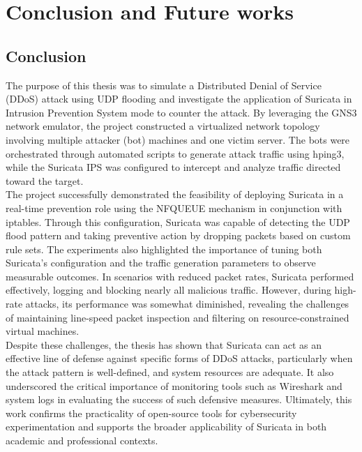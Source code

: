 \chapter{Conclusion and Future works}
\section{Conclusion}
The purpose of this thesis was to simulate a Distributed Denial of Service (DDoS) attack using UDP flooding and investigate the application of Suricata in Intrusion Prevention System mode to counter the attack. By leveraging the GNS3 network emulator, the project constructed a virtualized network topology involving multiple attacker (bot) machines and one victim server. The bots were orchestrated through automated scripts to generate attack traffic using hping3, while the Suricata IPS was configured to intercept and analyze traffic directed toward the target.
\\
The project successfully demonstrated the feasibility of deploying Suricata in a real-time prevention role using the NFQUEUE mechanism in conjunction with iptables. Through this configuration, Suricata was capable of detecting the UDP flood pattern and taking preventive action by dropping packets based on custom rule sets. The experiments also highlighted the importance of tuning both Suricata’s configuration and the traffic generation parameters to observe measurable outcomes. In scenarios with reduced packet rates, Suricata performed effectively, logging and blocking nearly all malicious traffic. However, during high-rate attacks, its performance was somewhat diminished, revealing the challenges of maintaining line-speed packet inspection and filtering on resource-constrained virtual machines.
\\
Despite these challenges, the thesis has shown that Suricata can act as an effective line of defense against specific forms of DDoS attacks, particularly when the attack pattern is well-defined, and system resources are adequate. It also underscored the critical importance of monitoring tools such as Wireshark and system logs in evaluating the success of such defensive measures. Ultimately, this work confirms the practicality of open-source tools for cybersecurity experimentation and supports the broader applicability of Suricata in both academic and professional contexts.
